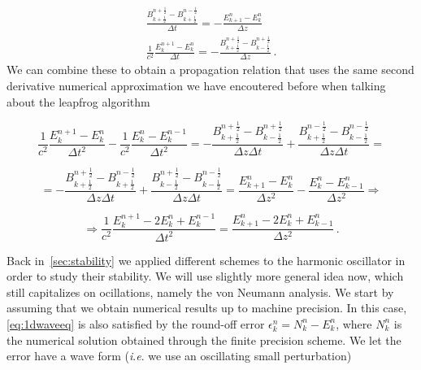 \documentclass[12pt, class=report, crop=false]{standalone}
\begin{document}
\begin{subequations}
  \begin{align}
    \frac{B^{n+\frac{1}{2}}_{k+\frac{1}{2}} - B^{n-\frac{1}{2}}_{k+\frac{1}{2}}}{\Delta t} =
    -\frac{E^n_{k+1} - E^n_k}{\Delta z}\\
    \frac{1}{c^2} \frac{E^{n+1}_k - E^n_k}{\Delta t} =
    -\frac{B^{n+\frac{1}{2}}_{k+\frac{1}{2}} - B^{n+\frac{1}{2}}_{k-\frac{1}{2}}}{\Delta z}\,.
  \end{align}
\end{subequations}
We can combine these to obtain a propagation relation that uses the same second derivative numerical approximation we have encoutered before when talking about the leapfrog algorithm

\begin{equation*}
  \frac{1}{c^2} \frac{E^{n+1}_k - E^n_k}{\Delta t^2} -
  \frac{1}{c^2} \frac{E^{n}_k - E^{n-1}_k}{\Delta t^2} =
  -\frac{B^{n+\frac{1}{2}}_{k+\frac{1}{2}} - B^{n+\frac{1}{2}}_{k-\frac{1}{2}}}{\Delta z \Delta t} +\frac{B^{n-\frac{1}{2}}_{k+\frac{1}{2}} - B^{n-\frac{1}{2}}_{k-\frac{1}{2}}}{\Delta z \Delta t} =
\end{equation*}

\begin{equation*}
  = - \frac{B^{n+\frac{1}{2}}_{k+\frac{1}{2}} - B^{n-\frac{1}{2}}_{k+\frac{1}{2}}}{\Delta z \Delta t} + \frac{B^{n+\frac{1}{2}}_{k-\frac{1}{2}} - B^{n-\frac{1}{2}}_{k-\frac{1}{2}}}{\Delta z \Delta t} =
  \frac{E^n_{k+1} - E^n_k}{\Delta z^2} - \frac{E^n_{k} - E^n_{k-1}}{\Delta z^2} \Rightarrow
\end{equation*}

\begin{equation}
  \label{eq:1dwaveeq}
  \Rightarrow \frac{1}{c^2} \frac{E^{n+1}_k - 2E^n_k + E^{n-1}_k}{\Delta t^2} =
  \frac{E^n_{k+1} - 2 E^n_k + E^n_{k-1}}{\Delta z^2}\,.
\end{equation}

Back in~\cref{sec:stability} we applied different schemes to the harmonic oscillator in order to study their stability. We will use slightly more general idea now, which still capitalizes on ocillations, namely the von Neumann analysis. We start by assuming that we obtain numerical results up to machine precision. In this case, \cref{eq:1dwaveeq} is also satisfied by the round-off error \(\epsilon^n_k = N^n_k - E^n_k\), where \(N^n_k\) is the numerical solution obtained through the finite precision scheme. We let the error have a wave form (\textit{i}.\textit{e}. we use an oscillating small perturbation)
\end{document}
